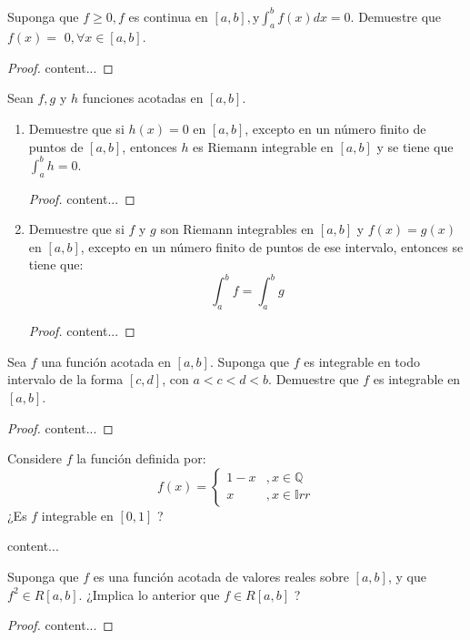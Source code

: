 





\begin{problema}
	Suponga que $f \geq 0, f$ es continua en $[a, b], \mathrm{y} \int_{a}^{b} f(x) d x=0 .$ Demuestre que $f(x)=$ $0, \forall x \in[a, b]$.
\end{problema}

\begin{proof}
	content...
\end{proof}

\begin{problema}
	Sean $f, g$ y $h$ funciones acotadas en $[a, b]$.
	\begin{enumerate}
		\item Demuestre que si $h(x)=0$ en $[a, b]$, excepto en un número finito de puntos de $[a, b]$, entonces $h$ es Riemann integrable en $[a, b]$ y se tiene que $\int_{a}^{b} h=0$.
		\begin{proof}
			content...
		\end{proof}
		\item Demuestre que si $f$ y $g$ son Riemann integrables en $[a, b]$ y $f(x)=g(x)$ en $[a, b]$, excepto en un número finito de puntos de ese intervalo, entonces se tiene que:
		$$
		\int_{a}^{b} f=\int_{a}^{b} g
		$$
		\begin{proof}
			content...
		\end{proof}
	\end{enumerate}
\end{problema}
\begin{problema}
	Sea $f$ una función acotada en $[a, b]$. Suponga que $f$ es integrable en todo intervalo de la forma $[c, d]$, con $a<c<d<b$. Demuestre que $f$ es integrable en $[a, b]$.
\end{problema}
\begin{proof}
	content...
\end{proof}

\begin{problema}
	 Considere $f$ la función definida por:
	$$
	f(x)=\left\{\begin{array}{cl}
		1-x &,  x \in \mathbb{Q} \\
		x  &,  x \in \mathbb{I}rr
	\end{array}\right.
	$$
	¿Es $f$ integrable en $[0,1]$ ?
\end{problema}
\begin{sol}
	content...
\end{sol}
\begin{problema}
	 Suponga que $f$ es una función acotada de valores reales sobre $[a, b]$, y que $f^{2} \in R[a, b]$. ¿Implica lo anterior que $f \in R[a, b]$ ?
\end{problema}
\begin{proof}
	content...
\end{proof}





%
%

